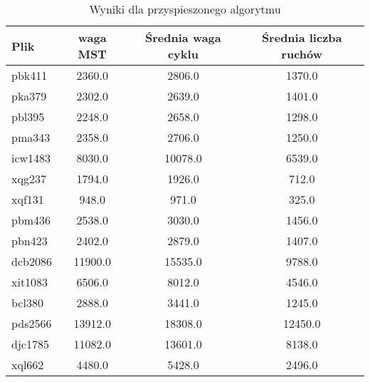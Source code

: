 \documentclass{article}
\begin{document}
\begin{table}[ht]
    \centering
    \begin{tabular}{|l|c|c|c|}
    \hline
    \textbf{Plik} & \textbf{waga MST} & \textbf{Średnia waga cyklu} & \textbf{Średnia liczba ruchów} \\
    \hline
    pbk411 & 2360.0 & 2806.0 & 1370.0 \\
    pka379 & 2302.0 & 2639.0 & 1401.0 \\
    pbl395 & 2248.0 & 2658.0 & 1298.0 \\
    pma343 & 2358.0 & 2706.0 & 1250.0 \\
    icw1483 & 8030.0 & 10078.0 & 6539.0 \\
    xqg237 & 1794.0 & 1926.0 & 712.0 \\
    xqf131 & 948.0 & 971.0 & 325.0 \\
    pbm436 & 2538.0 & 3030.0 & 1456.0 \\
    pbn423 & 2402.0 & 2879.0 & 1407.0 \\
    dcb2086 & 11900.0 & 15535.0 & 9788.0 \\
    xit1083 & 6506.0 & 8012.0 & 4546.0 \\
    bcl380 & 2888.0 & 3441.0 & 1245.0 \\
    pds2566 & 13912.0 & 18308.0 & 12450.0 \\
    djc1785 & 11082.0 & 13601.0 & 8138.0 \\
    xql662 & 4480.0 & 5428.0 & 2496.0 \\
    \hline
    \end{tabular}
    \caption{Wyniki dla przyspieszonego algorytmu}
\end{table}
    
\end{document}
